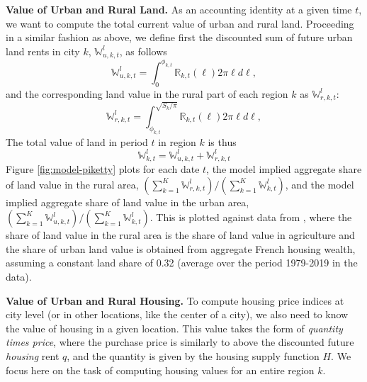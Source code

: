 \documentclass[11pt]{report}
\begin{document}
\textbf{Value of Urban and Rural Land.} As an accounting identity at a given time $t$, we want to compute the total current value of urban and rural land. Proceeding in a similar fashion as above, we define first the discounted sum of future urban land rents in city $k$, $\mathbb{W}_{u,k,t}^l$, as follows
\begin{equation*}
\mathbb{W}_{u,k,t}^l=\int_0^{\phi_{k,t}}  \mathbb{R}_{k,t}(\ell)2 \pi \ell d\ell ,
\end{equation*}
and the corresponding land value in the rural part of each region $k$ as $\mathbb{W}_{r,k,t}^l$:
\begin{equation*}
\mathbb{W}_{r,k,t}^l=\int_{\phi_{k,t}}^{\sqrt{S_{k}/\pi}} \mathbb{R}_{k,t}(\ell)2 \pi \ell d\ell,
\end{equation*}
The total value of land in period $t$ in region $k$ is thus
\begin{equation*}
\mathbb{W}_{k,t}^l=\mathbb{W}_{u,k,t}^l + \mathbb{W}_{r,k,t}^l
\end{equation*}
Figure \ref{fig:model-piketty} plots for each date $t$, the model implied aggregate share of land value in the rural area, $\left( \sum_{k=1}^{K}\mathbb{W}_{r,k,t}^l\right) /\left( \sum_{k=1}^{K}\mathbb{W}_{k,t}^l\right) $, and the model implied aggregate share of land value in the urban area, $\left( \sum_{k=1}^{K}\mathbb{W}_{u,k,t}^l\right) /\left( \sum_{k=1}^{K}\mathbb{W}_{k,t}^l\right) $. This is plotted against data from \cite{piketty2014capital}, where the share of land value in the rural area is the share of land value in agriculture and the share of urban land value is obtained from aggregate French housing wealth, assuming a constant land share of 0.32 (average over the period 1979-2019 in the data).

\textbf{Value of Urban and Rural Housing.} To compute housing price indices at city level (or in other locations, like the center of a city), we also need to know the value of housing in a given location. This value takes the form of \emph{quantity times price}, where the purchase price is similarly to above the discounted future \emph{housing} rent $q$, and the quantity is given by the housing supply function $H$. We focus here on the task of computing housing values for an entire region $k$.
\end{document}
